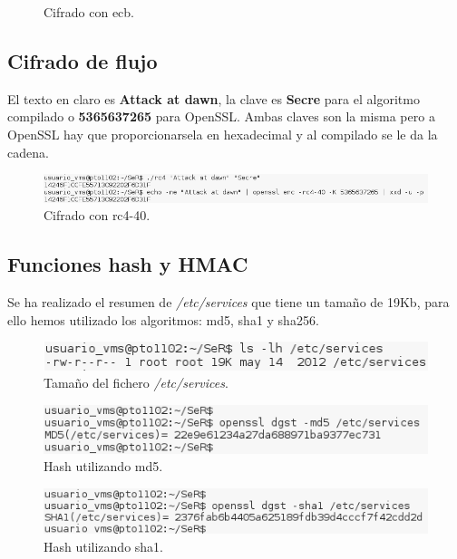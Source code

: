 \documentclass[11pt]{article}
\begin{document}
\begin{figure}[!ht]
\begin{minipage}[c]{.5\textwidth}
          \caption{Cifrado con ecb.}
        \end{minipage}
      \end{figure}

    \subsection{Cifrado de flujo}
      \par
      El texto en claro es \textbf{Attack at dawn}, la clave es \textbf{Secre} para el algoritmo compilado o \textbf{5365637265} para OpenSSL. Ambas claves son la misma pero a OpenSSL hay que proporcionarsela
      en hexadecimal y al compilado se le da la cadena.

      \begin{figure}[!ht]
        \centering
        \includegraphics[width = \textwidth]{cipher_rc4}
        \caption{Cifrado con rc4-40.}
      \end{figure}

    \subsection{Funciones hash y HMAC}
      \par
      Se ha realizado el resumen de \textit{/etc/services} que tiene un tamaño de 19Kb, para ello hemos utilizado los algoritmos: md5, sha1 y sha256.
      \begin{figure}[!ht]
        \centering
        \includegraphics[width = .8\textwidth]{etcserv_size}
        \caption{Tamaño del fichero \textit{/etc/services}.}
      \end{figure}

      \begin{figure}[!ht]
        \centering
        \includegraphics[width = .9\textwidth]{hash_md5}
        \caption{Hash utilizando md5.}
      \end{figure}

      \begin{figure}[!ht]
        \centering
        \includegraphics[width = .9\textwidth]{hash_sha1}
        \caption{Hash utilizando sha1.}
      \end{figure}
\end{document}
